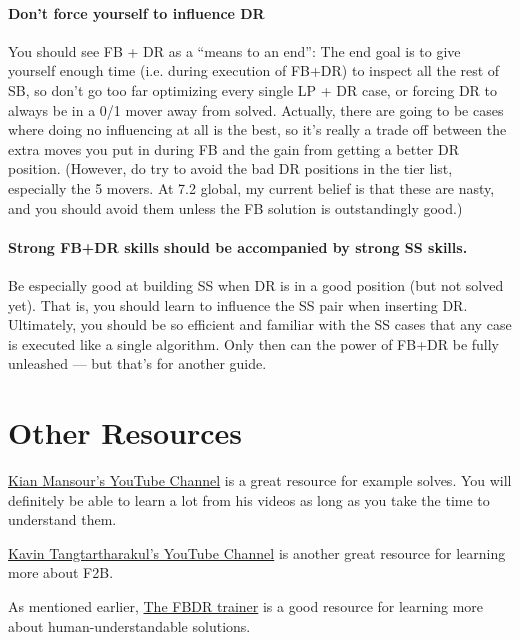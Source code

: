 \documentclass[12pt,letter]{article}
\begin{document}
\paragraph{Don’t force yourself to influence DR}

You should see FB + DR as a ``means to an end'': The end goal is to give yourself enough time (i.e. during execution of FB+DR) to inspect all the rest of SB, so don’t go too far optimizing every single LP + DR case, or forcing DR to always be in a 0/1 mover away from solved.
Actually, there are going to be cases where doing no influencing at all is the best, so it’s really a trade off between the extra moves you put in during FB and the gain from getting a better DR position. (However, do try to avoid the bad DR positions in the tier list, especially the 5 movers. At 7.2 global, my current belief is that these are nasty, and you should avoid them unless the FB solution is outstandingly good.)

\paragraph{Strong FB+DR skills should be accompanied by strong SS skills.}

Be especially good at building SS when DR is in a good position (but not solved yet). That is, you should learn to influence the SS pair when inserting DR. Ultimately, you should be so efficient and familiar with the SS cases that any case is executed like a single algorithm. Only then can the power of FB+DR be fully unleashed --- but that’s for another guide. 

\newpage\section{Other Resources}

\href{https://www.youtube.com/user/P3NGU1N5D0NTFLY/videos}{Kian Mansour's YouTube Channel} is a great resource for example solves. You will definitely be able to learn a lot from his videos as long as you take the time to understand them.

\href{https://www.youtube.com/user/franktangtartharakul}{Kavin Tangtartharakul's YouTube Channel} is another great resource for learning more about F2B.

As mentioned earlier, \href{https://onionhoney.github.io/roux-trainers/#fbdr}{The FBDR trainer} is a good resource for learning more about human-understandable solutions.
\end{document}

